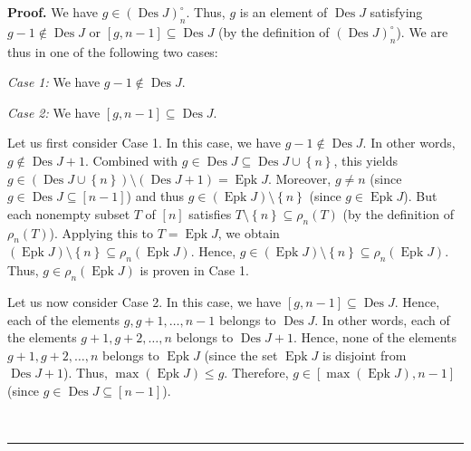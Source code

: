 \documentclass[numbers=enddot,12pt,final,onecolumn,notitlepage]{scrartcl}%
\theoremstyle{definition}
\newenvironment{proof}[1][Proof]{\noindent\textbf{#1.} }{\ \rule{0.5em}{0.5em}}
\begin{document}
\begin{proof}
We have $g\in\left(  \operatorname*{Des}J\right)  _{n}^{\circ}$. Thus, $g$ is
an element of $\operatorname*{Des}J$ satisfying $g-1\notin\operatorname*{Des}%
J$ or $\left[  g,n-1\right]  \subseteq\operatorname*{Des}J$ (by the definition
of $\left(  \operatorname*{Des}J\right)  _{n}^{\circ}$). We are thus in one of
the following two cases:

\textit{Case 1:} We have $g-1\notin\operatorname*{Des}J$.

\textit{Case 2:} We have $\left[  g,n-1\right]  \subseteq\operatorname*{Des}J$.

Let us first consider Case 1. In this case, we have $g-1\notin%
\operatorname*{Des}J$. In other words, $g\notin\operatorname*{Des}J+1$.
Combined with $g\in\operatorname*{Des}J\subseteq\operatorname*{Des}%
J\cup\left\{  n\right\}  $, this yields $g\in\left(  \operatorname*{Des}%
J\cup\left\{  n\right\}  \right)  \setminus\left(  \operatorname*{Des}%
J+1\right)  =\operatorname*{Epk}J$. Moreover, $g\neq n$ (since $g\in
\operatorname*{Des}J\subseteq\left[  n-1\right]  $) and thus $g\in\left(
\operatorname*{Epk}J\right)  \setminus\left\{  n\right\}  $ (since
$g\in\operatorname*{Epk}J$). But each nonempty subset $T$ of $\left[
n\right]  $ satisfies $T\setminus\left\{  n\right\}  \subseteq\rho_{n}\left(
T\right)  $ (by the definition of $\rho_{n}\left(  T\right)  $). Applying this
to $T=\operatorname*{Epk}J$, we obtain $\left(  \operatorname*{Epk}J\right)
\setminus\left\{  n\right\}  \subseteq\rho_{n}\left(  \operatorname*{Epk}%
J\right)  $. Hence, $g\in\left(  \operatorname*{Epk}J\right)  \setminus
\left\{  n\right\}  \subseteq\rho_{n}\left(  \operatorname*{Epk}J\right)  $.
Thus, $g\in\rho_{n}\left(  \operatorname*{Epk}J\right)  $ is proven in Case 1.

Let us now consider Case 2. In this case, we have $\left[  g,n-1\right]
\subseteq\operatorname*{Des}J$. Hence, each of the elements $g,g+1,\ldots,n-1$
belongs to $\operatorname*{Des}J$. In other words, each of the elements
$g+1,g+2,\ldots,n$ belongs to $\operatorname*{Des}J+1$. Hence, none of the
elements $g+1,g+2,\ldots,n$ belongs to $\operatorname*{Epk}J$ (since the set
$\operatorname*{Epk}J$ is disjoint from $\operatorname*{Des}J+1$). Thus,
$\max\left(  \operatorname*{Epk}J\right)  \leq g$. Therefore, $g\in\left[
\max\left(  \operatorname*{Epk}J\right)  ,n-1\right]  $ (since $g\in
\operatorname*{Des}J\subseteq\left[  n-1\right]  $).


\end{proof}
\end{document}
